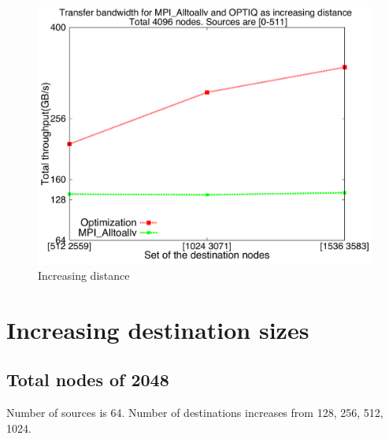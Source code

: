 \documentclass[letter]{article}
\begin{document}
\begin{figure}[h]
\vspace{-0.1in}
\centering
\includegraphics[scale=0.40]{report_figures/incrdist/incrdist_4k.pdf}
\vspace{-0.1in}
\caption{Increasing distance}
\vspace{-0.1in}
\label{fig:incrdist_4k}
\end{figure}

\clearpage
\newpage





\clearpage
\newpage

\section {Increasing destination sizes}

\subsection{Total nodes of 2048}

Number of sources is 64. Number of destinations increases from 128, 256, 512, 1024. 
\end{document}
